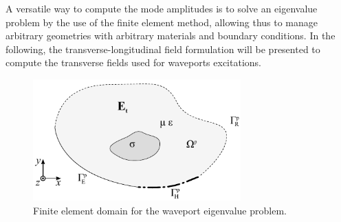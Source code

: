 A versatile way to compute the mode amplitudes is to solve an eigenvalue problem by the use of the finite element method, allowing thus to manage arbitrary geometries with arbitrary materials and boundary conditions. In the following, the transverse-longitudinal field formulation will be presented to compute the transverse fields used for waveports excitations.

\begin{figure}[hbpt!]
\centering
\includegraphics[width=8cm]{FEMproblemEigen} 
\caption{Finite element domain for the waveport eigenvalue problem.}
\label{fig:FEMproblemEigen}
\end{figure}

